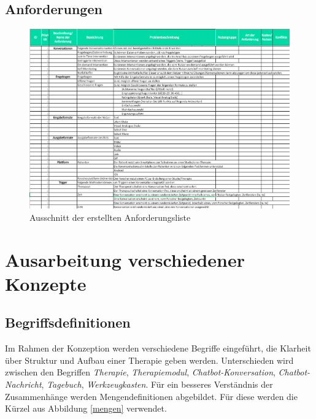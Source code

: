 \subsection{Anforderungen}

\begin{figure}[h]
\centering
\includegraphics[width=1\textwidth]{pictures/anforderungen}
\caption{Ausschnitt der erstellten Anforderungsliste}
\label{anforderungen}
\end{figure}

\section{Ausarbeitung verschiedener Konzepte}

\subsection{Begriffsdefinitionen}
Im Rahmen der Konzeption werden verschiedene Begriffe eingeführt, die Klarheit über Struktur und Aufbau einer Therapie geben werden. Unterschieden wird zwischen den Begriffen \emph{Therapie}, \emph{Therapiemodul}, \emph{Chatbot-Konversation}, \emph{Chatbot-Nachricht}, \emph{Tagebuch}, \emph{Werkzeugkasten}. Für ein besseres Verständnis der Zusammenhänge werden Mengendefinitionen abgebildet. Für diese werden die Kürzel aus Abbildung \ref{mengen} verwendet.



